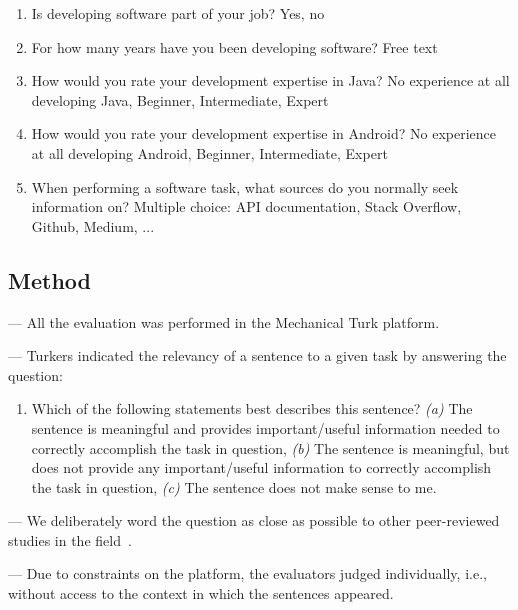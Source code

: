\begin{enumerate}[leftmargin=\parindent, font=\normalfont\itshape, label=BQ\textsubscript{\arabic*.}]
    \item Is developing software part of your job? Yes, no 
    \item For how many years have you been developing software? Free text
    \item How would you rate your development expertise in Java? No experience at all developing Java, Beginner, Intermediate, Expert
    \item How would you rate your development expertise in Android? No experience at all developing Android, Beginner, Intermediate, Expert
    \item When performing a software task, what sources do you normally seek information on? Multiple choice: API documentation, Stack Overflow, Github, Medium, ...
\end{enumerate}

   

\subsection{Method}


--- All the evaluation was performed in the Mechanical Turk platform. \vspace{3mm}

--- Turkers indicated the relevancy of a sentence to a given task  by answering the question: \vspace{3mm}

\begin{enumerate}[leftmargin=\parindent, font=\normalfont\itshape, label=SR\textsubscript{\arabic*}]
    \item Which of the following statements best describes this sentence? 
    \textit{(a)} The sentence is meaningful and provides important/useful information needed to correctly accomplish the task in question, 
    \textit{(b)} The sentence is meaningful, but does not provide any important/useful information to correctly accomplish the task in question, 
    \textit{(c)} The sentence does not make sense to me.
\end{enumerate}

--- We deliberately word the question as close as possible to other peer-reviewed studies in the field~\cite{nadi2020, Xu2017}. \vspace{3mm}


--- Due to constraints on the platform, the evaluators judged individually, i.e., without access to the context in which the sentences appeared. \vspace{3mm}

